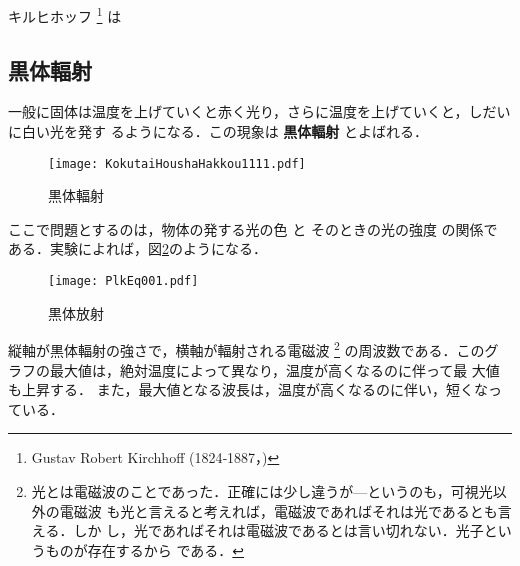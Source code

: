                 キルヒホッフ
                    \footnote{
                        Gustav Robert Kirchhoff (1824‐1887，)
                    }
                は

        \subsection{黒体輻射}
            一般に固体は温度を上げていくと赤く光り，さらに温度を上げていくと，しだいに白い光を発す
            るようになる．この現象は \textbf{黒体輻射} とよばれる．
                \begin{figure}[hbt]
                    \begin{center}
                        \texttt{[image: KokutaiHoushaHakkou1111.pdf]}
                        \caption{黒体輻射}
                        \label{fig:kokutai_housha_1}
                        \end{center}
                \end{figure}

            ここで問題とするのは，物体の発する光の色 と そのときの光の強度 の関係で
            ある．実験によれば，図\ref{fig:kokutai_housha_1}のようになる．
                \begin{figure}[hbt]
                    \begin{center}
                        \texttt{[image: PlkEq001.pdf]}
                        \caption{黒体放射}
                        \label{fig:kokutai_housha_1}
                        \end{center}
                \end{figure}

            縦軸が黒体輻射の強さで，横軸が輻射される電磁波
                \footnote{
                   光とは電磁波のことであった．正確には少し違うが---というのも，可視光以外の電磁波
                   も光と言えると考えれば，電磁波であればそれは光であるとも言える．しか
                   し，光であればそれは電磁波であるとは言い切れない．光子というものが存在するから
                   である．
                }
            の周波数である．このグラフの最大値は，絶対温度によって異なり，温度が高くなるのに伴って最
            大値も上昇する．
            また，最大値となる波長は，温度が高くなるのに伴い，短くなっている．

